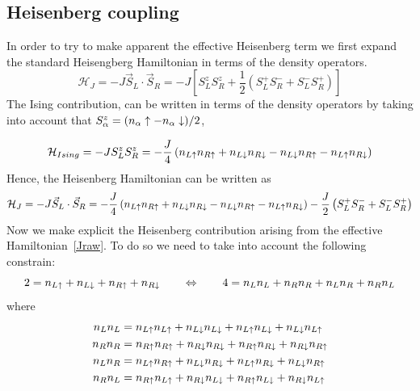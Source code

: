 \subsection{Heisenberg coupling}
In order to try to make apparent the effective Heisenberg term we first expand the standard Heisengberg Hamiltonian in terms of the density operators.
\begin{equation}
  \mathcal{H}_J = -J\vec{S}_L\cdot\vec{S}_R =
  -J \left[S^z_LS^z_R+\frac{1}{2}\left(S^+_LS^-_R+S^-_LS^+_R\right)\right]
\end{equation}
The Ising contribution, can be written in terms of the density operators by taking into account that $S^z_\alpha = (n_\alpha\uparrow-n_\alpha\downarrow)/2$,

\begin{equation}
  \mathcal{H}_{Ising} = -J S^z_LS^z_R = -\frac{J}{4}
      \left(n_{L\uparrow}n_{R\uparrow}+n_{L\downarrow}n_{R\downarrow}-
            n_{L\downarrow}n_{R\uparrow}-n_{L\uparrow}n_{R\downarrow}\right)
\label{Ising_goal}
\end{equation}
Hence, the Heisenberg Hamiltonian can be written as
\begin{equation}
  \mathcal{H}_J = -J\vec{S}_L\cdot\vec{S}_R =
  -\frac{J}{4}\left(n_{L\uparrow}n_{R\uparrow}+n_{L\downarrow}n_{R\downarrow}-
                    n_{L\downarrow}n_{R\uparrow}-n_{L\uparrow}n_{R\downarrow}\right)
  -\frac{J}{2}\left(S^+_LS^-_R+S^-_LS^+_R\right)
\label{heisenberg_goal}
\end{equation}
Now we make explicit the Heisenberg contribution arising from the effective Hamiltonian~\eqref{Jraw}. To do so we need to take into account the following constrain:
\begin{equation}
  2 = n_{L\uparrow} + n_{L\downarrow} + n_{R\uparrow} + n_{R\downarrow} \quad\quad\Leftrightarrow \quad\quad
  4 = n_Ln_L + n_Rn_R + n_Ln_R + n_Rn_L
\label{constrain}
\end{equation}
where
\begin{equation}
  \begin{split}
    n_Ln_L &= n_{L\uparrow}n_{L\uparrow} + n_{L\downarrow}n_{L\downarrow} +
              n_{L\uparrow}n_{L\downarrow} + n_{L\downarrow}n_{L\uparrow}\\
    n_Rn_R &= n_{R\uparrow}n_{R\uparrow} + n_{R\downarrow}n_{R\downarrow} +
              n_{R\uparrow}n_{R\downarrow} + n_{R\downarrow}n_{R\uparrow}\\
    n_Ln_R &= n_{L\uparrow}n_{R\uparrow} + n_{L\downarrow}n_{R\downarrow} +
              n_{L\uparrow}n_{R\downarrow} + n_{L\downarrow}n_{R\uparrow}\\
    n_Rn_L &= n_{R\uparrow}n_{L\uparrow} + n_{R\downarrow}n_{L\downarrow} +
              n_{R\uparrow}n_{L\downarrow} + n_{R\downarrow}n_{L\uparrow}
  \end{split}
\label{rename_nl_nr}
\end{equation}

